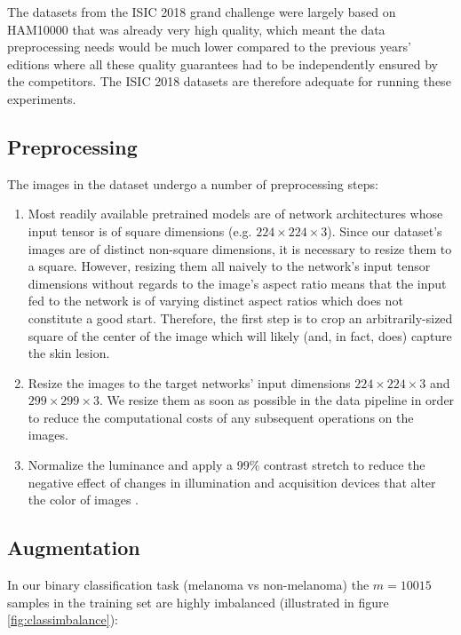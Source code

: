 The datasets from the ISIC 2018 grand challenge \cite{isic2018} were largely based on HAM10000 that was already very high quality, which meant the data preprocessing needs would be much lower compared to the previous years' editions where all these quality guarantees had to be independently ensured by the competitors. The ISIC 2018 datasets are therefore adequate for running these experiments.

\subsection{Preprocessing}
\label{subsection:preprocessing}

The images in the dataset undergo a number of preprocessing steps:

\begin{enumerate}
    \item Most readily available pretrained models are of network architectures whose input tensor is of square dimensions (e.g. $224 \times 224 \times 3$). Since our dataset's images are of distinct non-square dimensions, it is necessary to resize them to a square. However, resizing them all naively to the network's input tensor dimensions without regards to the image's aspect ratio means that the input fed to the network is of varying distinct aspect ratios which does not constitute a good start. Therefore, the first step is to crop an arbitrarily-sized square of the center of the image which will likely (and, in fact, does) capture the skin lesion.
    \item Resize the images to the target networks' input dimensions $224 \times 224 \times 3$ and $299 \times 299 \times 3$. We resize them as soon as possible in the data pipeline in order to reduce the computational costs of any subsequent operations on the images.
    \item Normalize the luminance and apply a 99\% contrast stretch to reduce the negative effect of changes in illumination and acquisition devices that alter the color of images \cite{colorconstancy}.
\end{enumerate}

\subsection{Augmentation}
\label{subsection:augmentation}

In our binary classification task (melanoma vs non-melanoma) the $m = 10015$ samples in the training set are highly imbalanced (illustrated in figure \ref{fig:classimbalance}):

